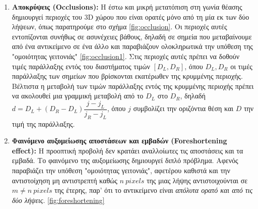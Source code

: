 \begin{enumerate}[label=\textbf{\arabic*.}, ref={\arabic*}]
	\item \label{prop:occlusions} \textbf{Αποκρύψεις \e(Occlusions):\g} Η έστω και μικρή μετατόπιση στη γωνία θέασης δημιουργεί περιοχές του \e 3D \g χώρου που είναι ορατές μόνο από τη μία εκ των δύο λήψεων, όπως παρατηρούμε στο σχήμα \ref{fig:occlusion}. Οι περιοχές αυτές εντοπίζονται συνήθως σε ασυνέχειες βάθους, δηλαδή σε σημεία που μεταβαίνουμε από ένα αντικείμενο σε ένα άλλο και παραβιάζουν ολοκληρωτικά την υπόθεση της "ομοιότητας γειτονιάς" \ref{fig:occlusion1}. Στις περιοχές αυτές πρέπει να δοθούν τιμές παράλλαξης εντός του διαστήματος τιμών $[D_L, D_R]$, όπου $D_L, D_R$ οι τιμές παράλλαξης των σημείων που βρίσκονται εκατέρωθεν της κρυμμένης περιοχής. Βέλτιστα η μεταβολή των τιμών παράλλαξης εντός της κρυμμένης περιοχής πρέπει να ακολουθεί μια γραμμική μεταβολή από το $D_L$ στο $D_R$, δηλαδή $d = D_L + (D_R - D_L)\dfrac{j - j_L}{j_R - j_L}$, όπου $j$ συμβολίζει την οριζόντια θέση και $D$ την τιμή της παράλλαξης.

	\item \label{prop:foreshortening_effect}\textbf{Φαινόμενο αυξομείωσης αποστάσεων και εμβαδών \e(Foreshortening effect):\g} Η προοπτική προβολή δεν κρατάει αναλλοίωτες τις αποστάσεις και τα εμβαδά. Το φαινόμενο της αυξομείωσης δημιουργεί διπλό πρόβλημα. Αφενός παραβιάζει την υπόθεση "ομοιότητας γειτονιάς", αφετέρου καθιστά και την αντιστοίχηση μη αντιστρεπτή καθώς $n \: pixels$ της μιας λήψης αντιστοιχούνται σε $m\neq n \: pixels$ της έτερης, παρ' ότι το αντικείμενο είναι \emph{απόλυτα ορατό και από τις δύο λήψεις}. \ref{fig:foreshortening}
	

\end{enumerate}
